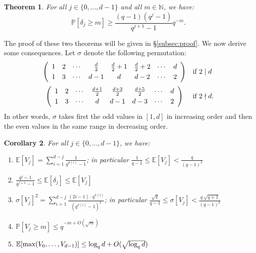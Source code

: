 \documentclass{jT}
\numberwithin{equation}{section}
\newtheorem{theo}{Theorem}[section]
\newtheorem{cor}[theo]{Corollary}
\theoremstyle{definition}
\newcommand{\N}{\mathbb N}
\renewcommand{\max}{\text{\rm max}}
\renewcommand{\P}{\mathbb P}
\newcommand{\E}{\mathbb E}
\begin{document}
\begin{theo}
\label{th:deltaj}
For all $j \in \{0, \ldots, d-1\}$ and all $m \in \N$, we have:
$$\P[\delta_j \geq m] \geq \frac{(q-1)(q^j-1)}{q^{j+1}-1} q^{-m}.$$
\end{theo}

The proof of these two theorems will be given in \S \ref{subsec:proof}. 
We now derive some consequences. Let $\sigma$ denote the following
permutation:
$$\begin{array}{cl}
\left(
\begin{array}{cccccccc}
1 & 2 & \cdots & \frac d 2 & \frac d 2 + 1 & \frac d 2 + 2 & \cdots & d \smallskip \\
1 & 3 & \cdots & d-1 & d & d-2 & \cdots & 2 
\end{array} \right) & \text{if } 2 \mid d \medskip \\
\left(
\begin{array}{cccccccc}
1 & 2 & \cdots & \frac{d+1} 2 & \frac{d+3} 2 & \frac{d+5} 2 & \cdots & d \smallskip \\
1 & 3 & \cdots & d & d-1 & d-3 & \cdots & 2 
\end{array} \right) & \text{if } 2 \nmid d.
\end{array}$$
In other words, $\sigma$ takes first the odd values in $[1,d]$ in 
increasing order and then the even values in the same range in 
decreasing order.

\begin{cor}
\label{cor:Vj}
For all $j \in \{0, \ldots, d-1\}$, we have:

\begin{enumerate}[\hspace{0.3cm}(1)]
\setlength\itemsep{0.1em}
\item $\E[V_j] = 
\displaystyle \sum_{i=1}^{d-j} \frac 1 {q^{\sigma(i)} - 1}$;
in particular $\frac 1 {q-1} \leq \E[V_j] < \frac q {(q-1)^2}$
\item $\frac {q^j - 1}{q^{j+1} - 1} \leq \E[\delta_j] \leq \E[V_j]$
\item $\sigma[V_j]^2 = 
\displaystyle \sum_{i=1}^{d-j} \frac {(2i-1) \cdot q^{\sigma(i)}}
{(q^{\sigma(i)} - 1)^2}$;
in particular $\frac{\sqrt q}{q-1} \leq \sigma[V_j] < 
\frac {q \:\sqrt{q+1}} {(q-1)^2}$
\item $\P[V_j \geq m] \leq q^{-m + O(\sqrt m)}$
\item $\E[\max(V_0, \ldots, V_{d-1})] \leq \log_q d + O(\sqrt{\log_q d})$
\end{enumerate}
\end{cor}
\end{document}
